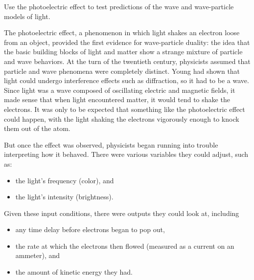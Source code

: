 \label{lab:photoelectric-effect}

\apparatus
{}

\begin{goals}

\item[] Use the photoelectric effect to test predictions of the wave
and wave-particle models of light.

\end{goals}

\introduction

The photoelectric effect, a phenomenon in which light shakes
an electron loose from an object, provided the first
evidence for wave-particle duality: the idea that the basic
building blocks of light and matter show a strange mixture
of particle and wave behaviors. At the turn of the twentieth
century, physicists assumed that particle and wave phenomena
were completely distinct. Young had shown that light could
undergo interference effects such as diffraction, so it had
to be a wave. Since light was a wave composed of oscillating
electric and magnetic fields, it made sense that when light
encountered matter, it would tend to shake the electrons. It
was only to be expected that something like the photoelectric
effect could happen, with the light shaking the electrons
vigorously enough to knock them out of the atom.

But once the effect was observed, physicists began running into
trouble interpreting how it behaved. There were various variables
they could adjust, such as:
\begin{itemize}
 \item the light's frequency (color), and
 \item the light's intensity (brightness).
\end{itemize}
Given these input conditions, there were outputs
they could look at, including
\begin{itemize}
  \item any time delay before electrons began to pop out,
  \item the rate at which the electrons then flowed (measured as a current on an ammeter), and
  \item the amount of kinetic energy they had.
\end{itemize}


